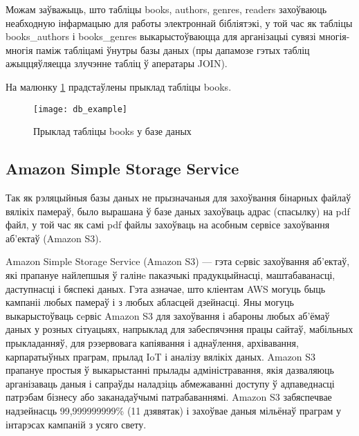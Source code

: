 Можам заўважыць, што табліцы books, authors, genres, readers захоўваюць неабходную інфармацыю для
работы электроннай бібліятэкі, у той час як табліцы books\_authors і books\_genres выкарыстоўваюцца
для арганізацыі сувязі многія-многія паміж табліцамі ўнутры базы даных (пры дапамозе гэтых табліц
ажыццяўляецца злучэнне табліц ў аператары JOIN).

На малюнку \ref{img: DB example} прадстаўлены прыклад табліцы books.

\begin{figure}[h!]
    \centering
    \texttt{[image: db\_example]}
    \caption{Прыклад табліцы books у базе даных}
    \label{img: DB example} 
\end{figure}

\subsection{Amazon Simple Storage Service}

Так як рэляцыйныя базы даных не прызначаныя для захоўвання бінарных файлаў вялікіх памераў,
было вырашана ў базе даных захоўваць адрас (спасылку) на pdf файл, у той час як самі
pdf файлы захоўваць на асобным сервісе захоўвання аб'ектаў (Amazon S3).

Amazon Simple Storage Service (Amazon S3) --- гэта сeрвіс захоўвання аб'ектаў, які прапануе найлепшыя ў галінe паказчыкі прадукцыйнасці, маштабаванасці, даступнасці і бяспекі даных. Гэта азначае, што кліентам AWS могуць быць кампаніі любых памераў і з любых абласцей дзейнасці. Яны могуць выкарыстоўваць сeрвіс Amazon S3 для захоўвання і абароны любых аб'ёмаў даных у розных сітуацыях, напрыклад для забеспячэння працы сайтаў, мабільных прыкладанняў, для рэзервовага капіявання і аднаўлення, архівавання, карпаратыўных праграм, прылад IoT і аналізу вялікіх даных. Amazon S3 прапануе простыя ў выкарыстанні прылады адміністравання, якія дазваляюць арганізаваць даныя і сапраўды наладзіць абмежаванні доступу ў адпаведнасці патрэбам бізнесу або заканадаўчымі патрабаваннямі. Amazon S3 забяспечвае надзейнасць 99,999999999\% (11 дзявятак) і захоўвае даныя мільёнаў праграм у інтарэсах кампаній з усяго свету.

